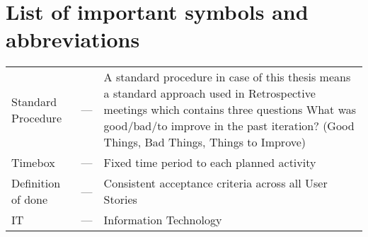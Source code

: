 \chapter*{List of important symbols and abbreviations}

\noindent
\begin{tabularx}{\textwidth}{p{4.5cm}p{0.75cm}X}
	Standard Procedure & ---	& A standard procedure in case of this thesis means a standard approach used in Retrospective meetings which contains three questions What was good/bad/to improve in the past iteration? (Good Things, Bad Things, Things to Improve) \\
	Timebox	& ---	& Fixed time period to each planned activity \\
	Definition of done & ---	& Consistent acceptance criteria across all User Stories \\
	IT & ---	& Information Technology 
\end{tabularx}
